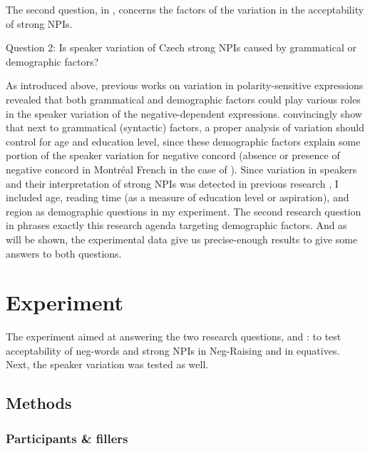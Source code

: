 \documentclass[output=paper,colorlinks,citecolor=brown]{langscibook}
\begin{document}
The second question, in , concerns the factors of the variation in the acceptability of strong NPIs. 

\ea\label{ex-7} Question 2: Is speaker variation of Czech strong NPIs caused by grammatical or demographic factors?\z

\noindent As introduced above, previous works on variation in polarity-sensitive expressions revealed that both grammatical and demographic factors could play various roles in the speaker variation of the negative-dependent expressions. \citet{burnett2015variable} convincingly show that next to grammatical (syntactic) factors, a proper analysis of variation should control for age and education level, since these demographic factors explain some portion of the speaker variation for negative concord (absence or presence of negative concord in Montréal French in the case of \citealt{burnett2015variable}). Since variation in speakers and their interpretation of strong NPIs was detected in previous research \citep{docekaldotlacilsubber,dovcekal2020n}, I included age, reading time (as a measure of education level or aspiration), and region as demographic questions in my experiment. The second research question in  phrases exactly this research agenda targeting demographic factors. And as will be shown, the experimental data give us precise-enough results to give some answers to both questions.

\section{Experiment}\label{sec:experiment}


The experiment aimed at answering the two research questions,  and : to test acceptability of neg-words and strong NPIs in Neg-Raising and in equatives. Next, the speaker variation was tested as well.

\subsection{Methods}

\subsubsection{Participants \& fillers} 
\end{document}
